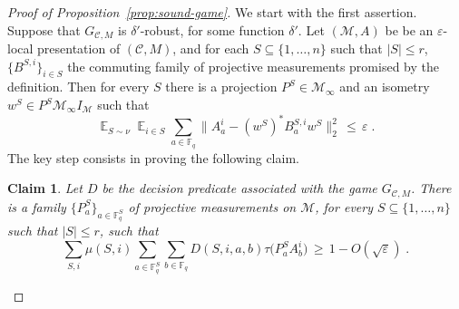 \documentclass[11pt]{article}
\newtheorem{claim}[theorem]{Claim}
\theoremstyle{definition}
\newcommand{\code}{\mathcal{C}}
\DeclareMathOperator*{\Expectation}{\mathbb{E}}
\newcommand{\Es}[1]{\Expectation_{#1}}
\newcommand{\F}{\ensuremath{\mathbb{F}}}
\newcommand{\mM}{\ensuremath{\mathcal{M}}}
\newcommand{\eps}{\varepsilon}
\begin{document}
\begin{proof}[Proof of Proposition~\ref{prop:sound-game}]
We start with the first assertion. Suppose that $G_{\code,M}$ is $\delta'$-robust, for some function $\delta'$. Let $(\mM,A)$ be be an $\eps$-local presentation of $(\code,M)$, and for each $S\subseteq\{1,\ldots,n\}$ such that $|S| \leq r$, $\{B^{S,i}\}_{i\in S}$ the commuting family of projective measurements promised by the definition. Then for every $S$ there is a projection $P^S \in \mM_\infty$ and an isometry $w^S\in P^S \mM_\infty I_\mM$ such that 
\[ \Es{S \sim \nu} \Es{i\in S} \sum_{a \in \F_q} \big\| A^i_a - (w^S)^* B^{S,i}_{a}w^S \big\|_2^2 \,\leq\,\eps\;.\]
The key step consists in proving the following claim. 

\begin{claim}\label{claim:sound-game-1}
Let $D$ be the decision predicate associated with the game $G_{\code,M}$.
There is a family  $\{P^S_a\}_{a\in \F_q^S}$  of projective measurements on $\mM$, for every  $S\subseteq\{1,\ldots,n\}$ such that $|S| \leq r$, such that
\begin{equation}
 \sum_{S,i} \mu(S,i) \sum_{a\in \F^S_q}\sum_{b\in\F_q} D(S,i,a,b) \tau\big(  P^S_a  A^i_{b}\big) \,\geq \,1-O(\sqrt{\eps})\;.\label{eq:s-g-4}
\end{equation}
\end{claim}


\end{proof}
\end{document}
